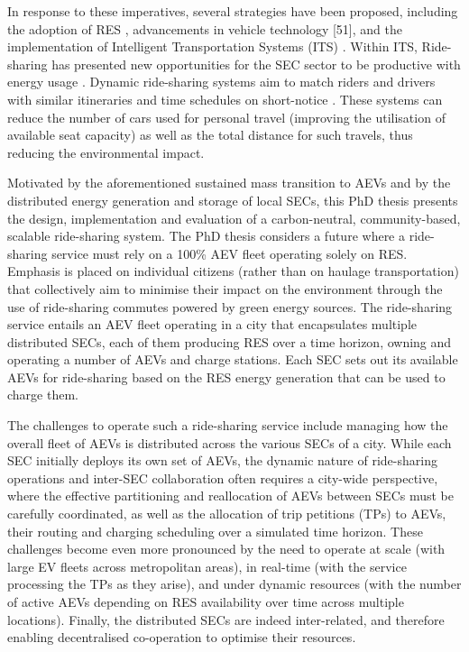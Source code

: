 In response to these imperatives, several strategies have been proposed, including the
adoption of RES \cite{gradisar2000enhancing}, advancements in vehicle technology [51], and the implementation of Intelligent Transportation Systems (ITS) \cite{wallar2019optimizing}. Within ITS, Ride-sharing has presented new opportunities for the SEC sector to be productive with energy usage \cite{agatz2012optimization}. Dynamic ride-sharing systems aim to match riders and drivers with similar itineraries and time schedules on short-notice \cite{soa_rideshare}. These systems can reduce the number of cars used for personal travel (improving the utilisation of available seat capacity) as well as the total distance for such travels, thus reducing the environmental impact.

Motivated by the aforementioned sustained mass transition to AEVs and by the distributed
energy generation and storage of local SECs, this PhD thesis presents the design, implementation
and evaluation of a carbon-neutral, community-based, scalable ride-sharing system. The
PhD thesis considers a future where a ride-sharing service must rely on a 100\% AEV fleet
operating solely on RES. Emphasis is placed on individual citizens (rather than on haulage
transportation) that collectively aim to minimise their impact on the environment through
the use of ride-sharing commutes powered by green energy sources. The ride-sharing
service entails an AEV fleet operating in a city that encapsulates multiple distributed SECs,
each of them producing RES over a time horizon, owning and operating a number of AEVs and charge stations. Each SEC sets out its available AEVs for ride-sharing based on the RES
energy generation that can be used to charge them.

The challenges to operate such a ride-sharing service include managing how the overall fleet of AEVs is distributed across the various SECs of a city. While each SEC initially deploys its own set of AEVs, the dynamic nature of ride-sharing operations and inter-SEC collaboration often requires a city-wide perspective, where the effective partitioning and reallocation of AEVs between SECs must be carefully coordinated, as well as the allocation of trip petitions (TPs) to AEVs, their routing and charging scheduling over a simulated time horizon. These challenges become even
more pronounced by the need to operate at scale (with large EV fleets across metropolitan
areas), in real-time (with the service processing the TPs as they arise), and under dynamic
resources (with the number of active AEVs depending on RES availability over time across
multiple locations). Finally, the distributed SECs are indeed inter-related, and therefore
enabling decentralised co-operation to optimise their resources.

